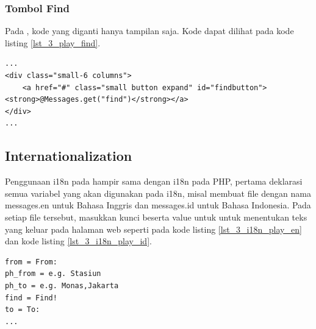\begin{enumerate}
%	
	
\end{enumerate}

\subsubsection{Tombol Find}
Pada \play, kode yang diganti hanya tampilan saja. Kode dapat dilihat pada kode listing \ref{lst_3_play_find}.

\begin{lstlisting}[caption=Fungsi JavaScript untuk ketika tombol \textit{find} ditekan,label = {lst_3_play_find}]
...
<div class="small-6 columns">
    <a href="#" class="small button expand" id="findbutton"><strong>@Messages.get("find")</strong></a>
</div>
...
\end{lstlisting}


\subsection{Internationalization}
Penggunaan i18n pada \play hampir sama dengan i18n pada PHP, pertama deklarasi semua variabel yang akan digunakan pada i18n, misal membuat file dengan nama messages.en untuk Bahasa Inggris dan messages.id untuk Bahasa Indonesia. Pada setiap file tersebut, masukkan kunci beserta value untuk untuk menentukan teks yang keluar pada halaman web seperti pada kode listing \ref{lst_3_i18n_play_en} dan kode listing \ref{lst_3_i18n_play_id}.

\begin{lstlisting}[caption=Script \play untuk Bahasa Inggris,label = {lst_3_i18n_play_en}]
from = From:
ph_from = e.g. Stasiun
ph_to = e.g. Monas,Jakarta
find = Find!
to = To:
...
\end{lstlisting}


